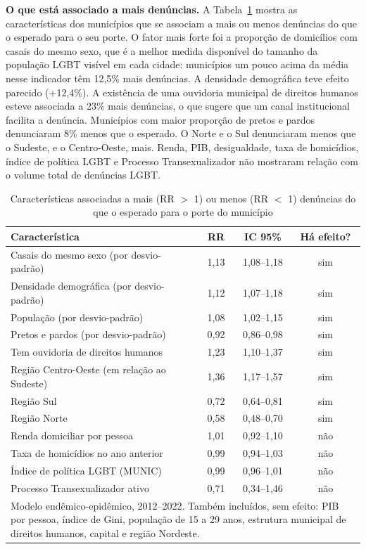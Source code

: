 \documentclass[12pt]{article}
\begin{document}
\textbf{O que está associado a mais denúncias.} A Tabela~\ref{tab:coef} mostra as características dos municípios que se associam a mais ou menos denúncias do que o esperado para o seu porte. O fator mais forte foi a proporção de domicílios com casais do mesmo sexo, que é a melhor medida disponível do tamanho da população LGBT visível em cada cidade: municípios um pouco acima da média nesse indicador têm 12,5\% mais denúncias. A densidade demográfica teve efeito parecido (+12,4\%). A existência de uma ouvidoria municipal de direitos humanos esteve associada a 23\% mais denúncias, o que sugere que um canal institucional facilita a denúncia. Municípios com maior proporção de pretos e pardos denunciaram 8\% menos que o esperado. O Norte e o Sul denunciaram menos que o Sudeste, e o Centro-Oeste, mais. Renda, PIB, desigualdade, taxa de homicídios, índice de política LGBT e Processo Transexualizador não mostraram relação com o volume total de denúncias LGBT.

\begin{table}[H]
\centering
\caption{Características associadas a mais (RR $>$ 1) ou menos (RR $<$ 1) denúncias do que o esperado para o porte do município}
\label{tab:coef}
{\renewcommand{\arraystretch}{1.25}\small
\begin{tabular}{p{6.8cm} c c c}
\hline
\textbf{Característica} & \textbf{RR} & \textbf{IC 95\%} & \textbf{Há efeito?} \\
\hline
Casais do mesmo sexo (por desvio-padrão) & 1,13 & 1,08--1,18 & sim \\
Densidade demográfica (por desvio-padrão) & 1,12 & 1,07--1,18 & sim \\
População (por desvio-padrão) & 1,08 & 1,02--1,15 & sim \\
Pretos e pardos (por desvio-padrão) & 0,92 & 0,86--0,98 & sim \\
Tem ouvidoria de direitos humanos & 1,23 & 1,10--1,37 & sim \\
Região Centro-Oeste (em relação ao Sudeste) & 1,36 & 1,17--1,57 & sim \\
Região Sul & 0,72 & 0,64--0,81 & sim \\
Região Norte & 0,58 & 0,48--0,70 & sim \\
Renda domiciliar por pessoa & 1,01 & 0,92--1,10 & não \\
Taxa de homicídios no ano anterior & 0,99 & 0,94--1,03 & não \\
Índice de política LGBT (MUNIC) & 0,99 & 0,96--1,01 & não \\
Processo Transexualizador ativo & 0,71 & 0,34--1,46 & não \\
\hline
\multicolumn{4}{p{12cm}}{\footnotesize Modelo endêmico-epidêmico, 2012--2022. Também incluídos, sem efeito: PIB por pessoa, índice de Gini, população de 15 a 29 anos, estrutura municipal de direitos humanos, capital e região Nordeste.}
\end{tabular}}
\end{table}
\end{document}
